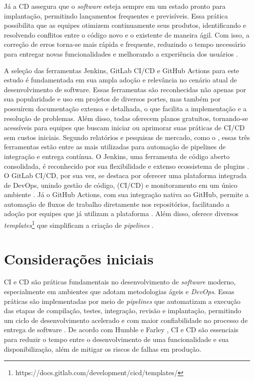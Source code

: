 Já a CD assegura que o \textit{software} esteja sempre em um estado pronto para implantação, permitindo lançamentos frequentes e previsíveis. Essa prática possibilita que as equipes otimizem continuamente seus produtos, identificando e resolvendo conflitos entre o código novo e o existente de maneira ágil. Com isso, a correção de erros torna-se mais rápida e frequente, reduzindo o tempo necessário para entregar novas funcionalidades e melhorando a experiência dos usuários \cite{RedHat2025}.

A seleção das ferramentas Jenkins, GitLab CI/CD e GitHub Actions para este estudo é fundamentada em sua ampla adoção e relevância no cenário atual de desenvolvimento de software. Essas ferramentas são reconhecidas não apenas por sua popularidade e uso em projetos de diversos portes, mas também por possuírem documentação extensa e detalhada, o que facilita a implementação e a resolução de problemas. Além disso, todas oferecem planos gratuitos, tornando-se acessíveis para equipes que buscam iniciar ou aprimorar suas práticas de CI/CD sem custos iniciais. Segundo relatórios e pesquisas de mercado, como o \cite{JetbrainsSurvey}, essas três ferramentas estão entre as mais utilizadas para automação de pipelines de integração e entrega contínua. O Jenkins, uma ferramenta de código aberto consolidada, é reconhecido por sua flexibilidade e extenso ecossistema de plugins \cite{JenkinsDocumentation}. O GitLab CI/CD, por sua vez, se destaca por oferecer uma plataforma integrada de DevOps, unindo gestão de código, (CI/CD) e monitoramento em um único ambiente \cite{GetStartedWithGitLab}. Já o GitHub Actions, com sua integração nativa ao GitHub, permite a automação de fluxos de trabalho diretamente nos repositórios, facilitando a adoção por equipes que já utilizam a plataforma \cite{GitHubGettingStarted}. Além disso, oferece diversos \textit{templates}\footnote{https://docs.gitlab.com/development/cicd/templates/} que simplificam a criação de \textit{pipelines} \cite{GitHubTemplates}.

\section{Considerações iniciais}\label{sec:consideracoesIniciais}

CI e CD são práticas fundamentais no desenvolvimento de \textit{software} moderno, especialmente em ambientes que adotam metodologias ágeis e \textit{DevOps}. Essas práticas são implementadas por meio de \textit{pipelines} que automatizam a execução das etapas de compilação, testes, integração, revisão e implantação, permitindo um ciclo de desenvolvimento acelerado e com maior confiabilidade no processo de entrega de software \cite{Fowler2024}. De acordo com Humble e Farley \cite{Humble2010}, CI e CD são essenciais para reduzir o tempo entre o desenvolvimento de uma funcionalidade e sua disponibilização, além de mitigar os riscos de falhas em produção.

